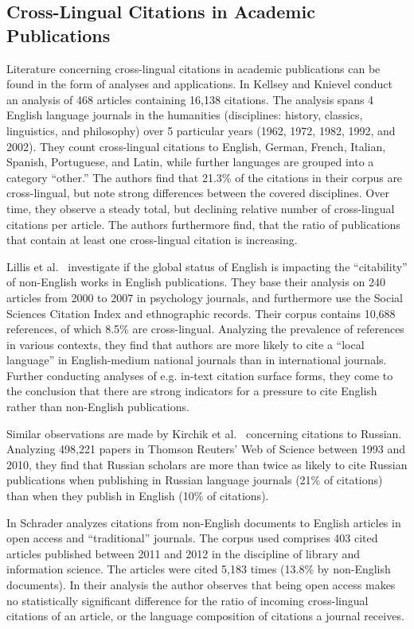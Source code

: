\subsection{Cross-Lingual Citations in Academic Publications}

Literature concerning cross-lingual citations in academic publications can be found in the form of analyses and applications. In \cite{Kellsey2004} Kellsey and Knievel conduct an analysis of 468 articles containing 16,138 citations. The analysis spans 4 English language journals in the humanities (disciplines: history, classics, linguistics, and philosophy) over 5 particular years (1962, 1972, 1982, 1992, and 2002). They count cross-lingual citations to English, German, French, Italian, Spanish, Portuguese, and Latin, while further languages are grouped into a category ``other.''
The authors find that 21.3\% of the citations in their corpus are cross-lingual, but note strong differences between the covered disciplines. Over time, they observe a steady total, but declining relative number of cross-lingual citations per article. The authors furthermore find, that the ratio of publications that contain at least one cross-lingual citation is increasing.

Lillis et al.~\cite{Lillis2010} investigate if the global status of English is impacting the ``citability'' of non-English works in English publications. They base their analysis on 240 articles from 2000 to 2007 in psychology journals, and furthermore use the Social Sciences Citation Index and ethnographic records. Their corpus contains 10,688 references, of which 8.5\% are cross-lingual. Analyzing the prevalence of references in various contexts, they find that authors are more likely to cite a ``local language'' in English-medium national journals than in international journals. Further conducting analyses of e.g. in-text citation surface forms, they come to the conclusion that there are strong indicators for a pressure to cite English rather than non-English publications.

Similar observations are made by Kirchik et al.~\cite{Kirchik2012} concerning citations to Russian. Analyzing 498,221 papers in Thomson Reuters' Web of Science between 1993 and 2010, they find that Russian scholars are more than twice as likely to cite Russian publications when publishing in Russian language journals (21\% of citations) than when they publish in English (10\% of citations).

In \cite{Schrader2019} Schrader analyzes citations from non-English documents to English articles in open access and ``traditional'' journals. The corpus used comprises 403 cited articles published between 2011 and 2012 in the discipline of library and information science. The articles were cited 5,183 times (13.8\% by non-English documents). In their analysis the author observes that being open access makes no statistically significant difference for the ratio of incoming cross-lingual citations of an article, or the language composition of citations a journal receives.

